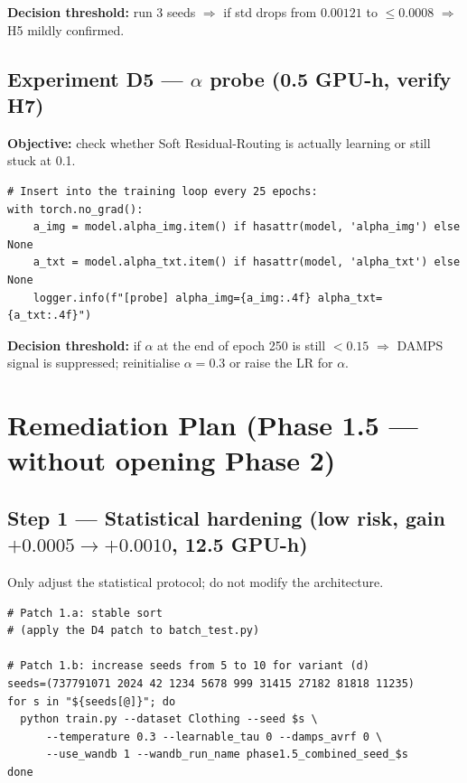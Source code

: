 \documentclass[11pt,a4paper]{article}
\begin{document}
\textbf{Decision threshold:} run 3 seeds $\Rightarrow$ if std drops from
$0.00121$ to $\leq 0.0008$ $\Rightarrow$ H5 mildly confirmed.

\subsection*{Experiment D5 --- $\alpha$ probe (0.5 GPU-h, verify H7)}

\textbf{Objective:} check whether Soft Residual-Routing is actually learning
or still stuck at 0.1.

\begin{lstlisting}[style=pystyle]
# Insert into the training loop every 25 epochs:
with torch.no_grad():
    a_img = model.alpha_img.item() if hasattr(model, 'alpha_img') else None
    a_txt = model.alpha_txt.item() if hasattr(model, 'alpha_txt') else None
    logger.info(f"[probe] alpha_img={a_img:.4f} alpha_txt={a_txt:.4f}")
\end{lstlisting}

\textbf{Decision threshold:} if $\alpha$ at the end of epoch 250 is still
$<0.15$ $\Rightarrow$ DAMPS signal is suppressed; reinitialise $\alpha=0.3$ or
raise the LR for $\alpha$.

\section{Remediation Plan (Phase 1.5 --- without opening Phase 2)}

\subsection*{Step 1 --- Statistical hardening (low risk, gain $+0.0005 \to +0.0010$, 12.5 GPU-h)}

Only adjust the statistical protocol; do not modify the architecture.

\begin{lstlisting}[style=bashstyle]
# Patch 1.a: stable sort
# (apply the D4 patch to batch_test.py)

# Patch 1.b: increase seeds from 5 to 10 for variant (d)
seeds=(737791071 2024 42 1234 5678 999 31415 27182 81818 11235)
for s in "${seeds[@]}"; do
  python train.py --dataset Clothing --seed $s \
      --temperature 0.3 --learnable_tau 0 --damps_avrf 0 \
      --use_wandb 1 --wandb_run_name phase1.5_combined_seed_$s
done
\end{lstlisting}
\end{document}
